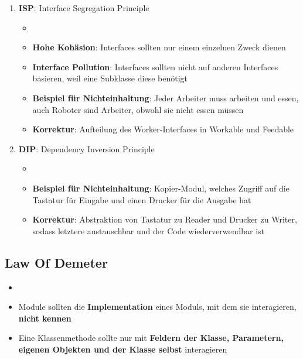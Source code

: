 \begin{enumerate}
\begin{itemize}
	\end{itemize}
	\item \textbf{ISP}: Interface Segregation Principle
	\begin{itemize}
		\item {}
		\item \textbf{Hohe Kohäsion}: Interfaces sollten nur einem einzelnen Zweck dienen
		\item \textbf{Interface Pollution}: Interfaces sollten nicht auf anderen Interfaces basieren, weil eine Subklasse diese benötigt
		\item \textbf{Beispiel für Nichteinhaltung}: Jeder Arbeiter muss arbeiten und essen, auch Roboter sind Arbeiter, obwohl sie nicht essen müssen
		\item \textbf{Korrektur}: Aufteilung des Worker-Interfaces in Workable und Feedable
	\end{itemize}
	\item \textbf{DIP}: Dependency Inversion Principle
	\begin{itemize}
		\item {}
		\item \textbf{Beispiel für Nichteinhaltung}: Kopier-Modul, welches Zugriff auf die Tastatur für Eingabe und einen Drucker für die Ausgabe hat
		\item \textbf{Korrektur}: Abstraktion von Tastatur zu Reader und Drucker zu Writer, sodass letztere austauschbar und der Code wiederverwendbar ist
	\end{itemize}
\end{enumerate}

\subsection{Law Of Demeter}
\label{cc:sub:law_of_demeter}

\begin{itemize}
	\item {}
	\item Module sollten die \textbf{Implementation} eines Moduls, mit dem sie interagieren, \textbf{nicht kennen}
	\item Eine Klassenmethode sollte nur mit \textbf{Feldern der Klasse, Parametern, eigenen Objekten und der Klasse selbst} interagieren
\end{itemize}

